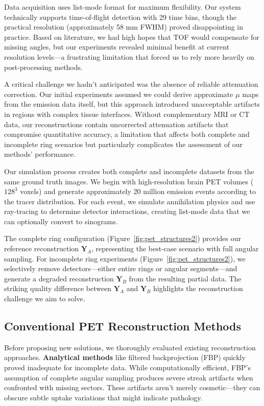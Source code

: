 \documentclass[
reprint,
superscriptaddress,
nofootinbib,
amsmath,amssymb,
aps,
prd,
]{revtex4-2}
\begin{document}
Data acquisition uses list-mode format for maximum flexibility. Our system technically supports time-of-flight detection with 29 time bins, though the practical resolution (approximately 58 mm FWHM) proved disappointing in practice. Based on literature, we had high hopes that TOF would compensate for missing angles, but our experiments revealed minimal benefit at current resolution levels—a frustrating limitation that forced us to rely more heavily on post-processing methods.

A critical challenge we hadn't anticipated was the absence of reliable attenuation correction. Our initial experiments assumed we could derive approximate $\mu$ maps from the emission data itself, but this approach introduced unacceptable artifacts in regions with complex tissue interfaces. Without complementary MRI or CT data, our reconstructions contain uncorrected attenuation artifacts that compromise quantitative accuracy, a limitation that affects both complete and incomplete ring scenarios but particularly complicates the assessment of our methods' performance.

Our simulation process creates both complete and incomplete datasets from the same ground truth images. We begin with high-resolution brain PET volumes ($128^3$ voxels) and generate approximately 20 million emission events according to the tracer distribution. For each event, we simulate annihilation physics and use ray-tracing to determine detector interactions, creating list-mode data that we can optionally convert to sinograms. 

The complete ring configuration (Figure~\ref{fig:pet_structures2}) provides our reference reconstruction $\mathbf{Y}_A$, representing the best-case scenario with full angular sampling. For incomplete ring experiments (Figure~\ref{fig:pet_structures2}), we selectively remove detectors—either entire rings or angular segments—and generate a degraded reconstruction $\mathbf{Y}_B$ from the resulting partial data. The striking quality difference between $\mathbf{Y}_A$ and $\mathbf{Y}_B$ highlights the reconstruction challenge we aim to solve.
\subsection{Conventional PET Reconstruction Methods}

Before proposing new solutions, we thoroughly evaluated existing reconstruction approaches. \textbf{Analytical methods} like filtered backprojection (FBP) quickly proved inadequate for incomplete data. While computationally efficient, FBP's assumption of complete angular sampling produces severe streak artifacts when confronted with missing sectors. These artifacts aren't merely cosmetic—they can obscure subtle uptake variations that might indicate pathology.
\end{document}
